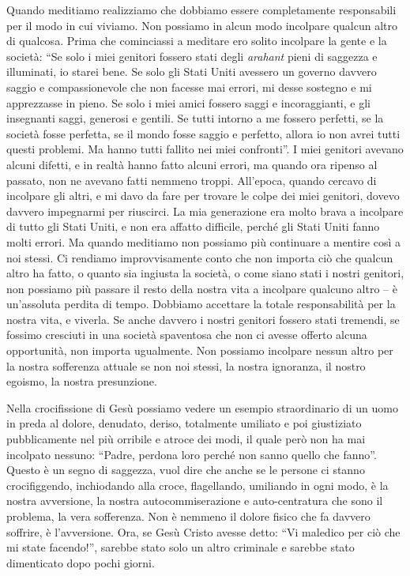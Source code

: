 Quando meditiamo realizziamo che dobbiamo essere completamente
responsabili per il modo in cui viviamo. Non possiamo in alcun modo
incolpare qualcun altro di qualcosa. Prima che cominciassi a meditare
ero solito incolpare la gente e la società: ``Se solo i miei genitori
fossero stati degli \emph{arahant} pieni di saggezza e illuminati, io
starei bene. Se solo gli Stati Uniti avessero un governo davvero saggio
e compassionevole che non facesse mai errori, mi desse sostegno e mi
apprezzasse in pieno. Se solo i miei amici fossero saggi e
incoraggianti, e gli insegnanti saggi, generosi e gentili. Se tutti
intorno a me fossero perfetti, se la società fosse perfetta, se il mondo
fosse saggio e perfetto, allora io non avrei tutti questi problemi. Ma
hanno tutti fallito nei miei confronti''. I miei genitori avevano alcuni
difetti, e in realtà hanno fatto alcuni errori, ma quando ora ripenso al
passato, non ne avevano fatti nemmeno troppi. All'epoca, quando cercavo
di incolpare gli altri, e mi davo da fare per trovare le colpe dei miei
genitori, dovevo davvero impegnarmi per riuscirci. La mia generazione
era molto brava a incolpare di tutto gli Stati Uniti, e non era affatto
difficile, perché gli Stati Uniti fanno molti errori. Ma quando
meditiamo non possiamo più continuare a mentire così a noi stessi. Ci
rendiamo improvvisamente conto che non importa ciò che qualcun altro ha
fatto, o quanto sia ingiusta la società, o come siano stati i nostri
genitori, non possiamo più passare il resto della nostra vita a
incolpare qualcuno altro -- è un'assoluta perdita di tempo. Dobbiamo
accettare la totale responsabilità per la nostra vita, e viverla. Se
anche davvero i nostri genitori fossero stati tremendi, se fossimo
cresciuti in una società spaventosa che non ci avesse offerto alcuna
opportunità, non importa ugualmente. Non possiamo incolpare nessun altro
per la nostra sofferenza attuale se non noi stessi, la nostra ignoranza,
il nostro egoismo, la nostra presunzione.

Nella crocifissione di Gesù possiamo vedere un esempio straordinario di
un uomo in preda al dolore, denudato, deriso, totalmente umiliato e poi
giustiziato pubblicamente nel più orribile e atroce dei modi, il quale
però non ha mai incolpato nessuno: ``Padre, perdona loro perché non
sanno quello che fanno''. Questo è un segno di saggezza, vuol dire che
anche se le persone ci stanno crocifiggendo, inchiodando alla croce,
flagellando, umiliando in ogni modo, è
la nostra avversione, la nostra autocommiserazione e auto-centratura che
sono il problema, la vera sofferenza. Non è nemmeno il dolore fisico che
fa davvero soffrire, è l'avversione. Ora, se Gesù Cristo avesse detto:
``Vi maledico per ciò che mi state facendo!'', sarebbe stato solo un
altro criminale e sarebbe stato dimenticato dopo pochi giorni.

